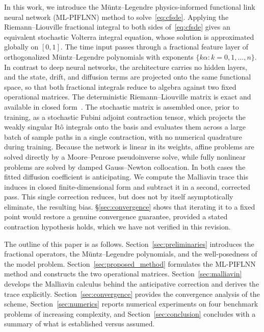 \documentclass[11pt, a4paper]{article}
\theoremstyle{theoremstyle}
\theoremstyle{definitionstyle}
\begin{document}
In this work, we introduce the M\"untz--Legendre physics-informed functional
link neural network (ML-PIFLNN) method to solve~\eqref{eq:cfsde}. Applying the
Riemann--Liouville fractional integral to both sides of~\eqref{eq:cfsde} gives
an equivalent stochastic Volterra integral equation, whose solution is
approximated globally on $[0,1]$. The time input passes through a fractional
feature layer of orthogonalized M\"untz--Legendre polynomials with exponents
$\{k\alpha : k=0,1,\dots,n\}$. In contrast to deep neural networks, the
architecture carries no hidden layers, and the state, drift, and diffusion terms
are projected onto the same functional space, so that both fractional integrals
reduce to algebra against two fixed operational matrices. The deterministic
Riemann--Liouville matrix is exact and available in closed
form~\cite{kumari2025fractional}. The stochastic matrix is assembled once, prior
to training, as a stochastic Fubini adjoint contraction tensor, which projects
the weakly singular It\^o integrals onto the basis and evaluates them across a
large batch of sample paths in a single contraction, with no numerical
quadrature during training. Because the network is linear in its weights,
affine problems are solved directly by a Moore--Penrose pseudoinverse solve,
while fully nonlinear problems are solved by damped Gauss--Newton collocation.
In both cases the fitted diffusion coefficient is anticipating. We compute the
Malliavin trace this induces in closed finite-dimensional form and subtract it
in a second, corrected pass. This single correction reduces, but does not by
itself asymptotically eliminate, the resulting bias. \S\ref{sec:convergence}
shows that iterating it to a fixed point would restore a genuine convergence
guarantee, provided a stated contraction hypothesis holds, which we have not
verified in this revision.

The outline of this paper is as follows. Section~\ref{sec:preliminaries}
introduces the fractional operators, the M\"untz--Legendre polynomials, and the
well-posedness of the model problem. Section~\ref{sec:proposed_method}
formulates the ML-PIFLNN method and constructs the two operational matrices.
Section~\ref{sec:malliavin} develops the Malliavin calculus behind the
anticipative correction and derives the trace explicitly.
Section~\ref{sec:convergence} provides the convergence analysis of the scheme,
Section~\ref{sec:numerics} reports numerical experiments on four benchmark
problems of increasing complexity, and Section~\ref{sec:conclusion} concludes
with a summary of what is established versus assumed.
\end{document}
